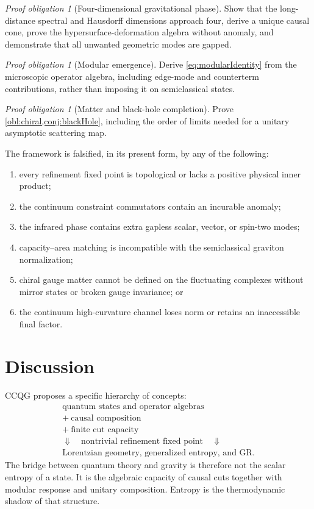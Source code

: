 \documentclass[11pt]{article}
\theoremstyle{remark}
\newtheorem{obligation}[definition]{Proof obligation}
\begin{document}
\begin{obligation}[Four-dimensional gravitational phase]
Show that the long-distance spectral and Hausdorff dimensions approach
four, derive a unique causal cone, prove the hypersurface-deformation
algebra without anomaly, and demonstrate that all unwanted geometric
modes are gapped.
\end{obligation}

\begin{obligation}[Modular emergence]
Derive \eqref{eq:modularIdentity} from the microscopic operator algebra,
including edge-mode and counterterm contributions, rather than imposing
it on semiclassical states.
\end{obligation}

\begin{obligation}[Matter and black-hole completion]
Prove \cref{obl:chiral,conj:blackHole}, including the order of limits
needed for a unitary asymptotic scattering map.
\end{obligation}

The framework is falsified, in its present form, by any of the following:
\begin{enumerate}
  \item every refinement fixed point is topological or lacks a positive
        physical inner product;
  \item the continuum constraint commutators contain an incurable anomaly;
  \item the infrared phase contains extra gapless scalar, vector, or
        spin-two modes;
  \item capacity--area matching is incompatible with the semiclassical
        graviton normalization;
  \item chiral gauge matter cannot be defined on the fluctuating
        complexes without mirror states or broken gauge invariance; or
  \item the continuum high-curvature channel loses norm or retains an
        inaccessible final factor.
\end{enumerate}

\section{Discussion}

CCQG proposes a specific hierarchy of concepts:
\begin{equation}
\boxed{
\begin{gathered}
\text{quantum states and operator algebras}\\
+\ \text{causal composition}\\
+\ \text{finite cut capacity}\\[2mm]
\Downarrow\quad\text{nontrivial refinement fixed point}\quad\Downarrow\\[2mm]
\text{Lorentzian geometry, generalized entropy, and GR}.
\end{gathered}}
\end{equation}
The bridge between quantum theory and gravity is therefore not the scalar
entropy of a state.  It is the algebraic capacity of causal cuts together
with modular response and unitary composition.  Entropy is the
thermodynamic shadow of that structure.
\end{document}
